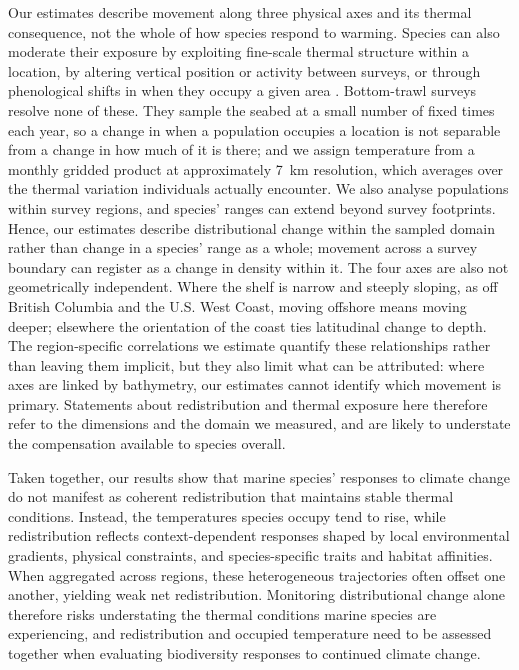 \documentclass[9pt,twocolumn,twoside]{pnas-new}
\begin{document}
Our estimates describe movement along three physical axes and its thermal consequence, not the whole of how species respond to warming. Species can also moderate their exposure by exploiting fine-scale thermal structure within a location, by altering vertical position or activity between surveys, or through phenological shifts in when they occupy a given area \citep{lawlor_mechanisms_2024, fredston_reimagining_2025, neate-cleggAdvancesBreedingPhenology2024}. Bottom-trawl surveys resolve none of these. They sample the seabed at a small number of fixed times each year, so a change in when a population occupies a location is not separable from a change in how much of it is there; and we assign temperature from a monthly gridded product at approximately 7~km resolution, which averages over the thermal variation individuals actually encounter. We also analyse populations within survey regions, and species' ranges can extend beyond survey footprints. Hence, our estimates describe distributional change within the sampled domain rather than change in a species' range as a whole; movement across a survey boundary can register as a change in density within it. The four axes are also not geometrically independent. Where the shelf is narrow and steeply sloping, as off British Columbia and the U.S. West Coast, moving offshore means moving deeper; elsewhere the orientation of the coast ties latitudinal change to depth. The region-specific correlations we estimate quantify these relationships rather than leaving them implicit, but they also limit what can be attributed: where axes are linked by bathymetry, our estimates cannot identify which movement is primary. Statements about redistribution and thermal exposure here therefore refer to the dimensions and the domain we measured, and are likely to understate the compensation available to species overall.

Taken together, our results show that marine species' responses to climate change do not manifest as coherent redistribution that maintains stable thermal conditions. Instead, the temperatures species occupy tend to rise, while redistribution reflects context-dependent responses shaped by local environmental gradients, physical constraints, and species-specific traits and habitat affinities. When aggregated across regions, these heterogeneous trajectories often offset one another, yielding weak net redistribution. Monitoring distributional change alone therefore risks understating the thermal conditions marine species are experiencing, and redistribution and occupied temperature need to be assessed together when evaluating biodiversity responses to continued climate change.
%
\end{document}
